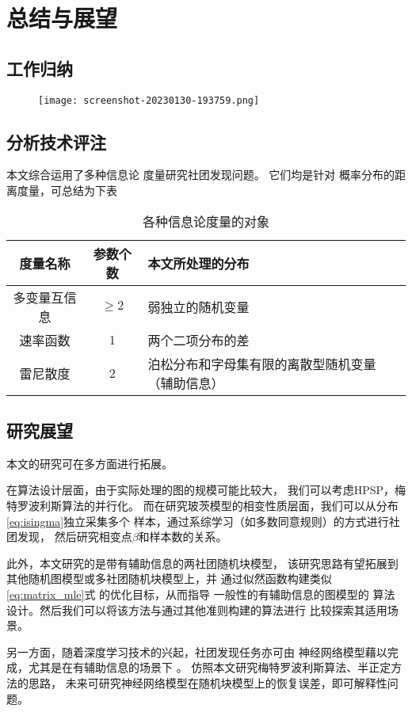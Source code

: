 \chapter{总结与展望}
\section{工作归纳}

\begin{figure}[!ht]
    \texttt{[image: screenshot-20230130-193759.png]}
\end{figure}

\section{分析技术评注}
本文综合运用了多种信息论
度量研究社团发现问题。
它们均是针对
概率分布的距离度量，可总结为下表
\begin{table}[!ht]
    \centering
  \begin{tabular}{ccp{5cm}}
    \hline
     度量名称    &   参数个数 &   本文所处理的分布 \\
    \hline
     多变量互信息 &    $\geq 2$ &    弱独立的随机变量  \\
     速率函数     &    1 &     两个二项分布的差  \\
     雷尼散度     &    2 &    泊松分布和字母集有限的离散型随机变量（辅助信息） \\
    \hline
  \end{tabular}
  \caption{各种信息论度量的对象}\label{tab:info_metric}
\end{table}
  
\section{研究展望}
本文的研究可在多方面进行拓展。

在算法设计层面，由于实际处理的图的规模可能比较大，
我们可以考虑HPSP，梅特罗波利斯算法的并行化。
而在研究玻茨模型的相变性质层面，我们可以从分布
\eqref{eq:isingma}独立采集多个
样本，通过系综学习（如多数同意规则）的方式进行社团发现，
然后研究相变点$\beta$和样本数的关系。

此外，本文研究的是带有辅助信息的两社团随机块模型，
该研究思路有望拓展到其他随机图模型或多社团随机块模型上，并
通过似然函数构建类似\eqref{eq:matrix_mle}式
的优化目标，从而指导
一般性的有辅助信息的图模型的
算法设计。然后我们可以将该方法与通过其他准则\cite{chunaev2020community}构建的算法进行
比较探索其适用场景。

另一方面，随着深度学习技术的兴起，社团发现任务亦可由
神经网络模型藉以完成，尤其是在有辅助信息的场景下 \cite{cao2018incorporating}。
仿照本文研究梅特罗波利斯算法、半正定方法的思路，
未来可研究神经网络模型在随机块模型上的恢复误差，即可解释性问题。